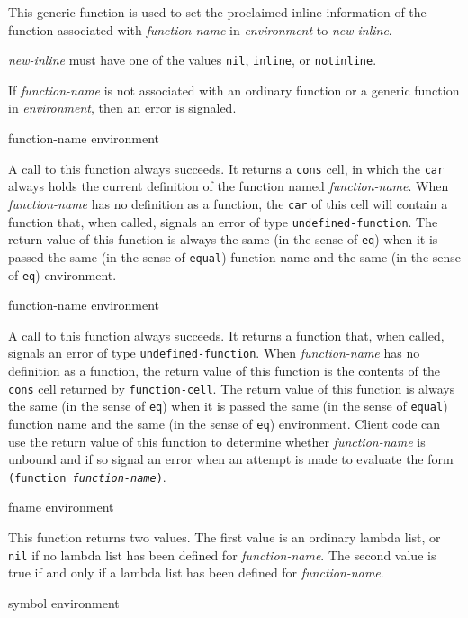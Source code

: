 This generic function is used to set the proclaimed inline information
of the function associated with \textit{function-name} in
\textit{environment} to \textit{new-inline}.

\textit{new-inline} must have one of the values \texttt{nil},
\texttt{inline}, or \texttt{notinline}.

If \textit{function-name} is not associated with an ordinary function
or a generic function in \textit{environment}, then an error is
signaled.

 {function-name environment}

A call to this function always succeeds.  It returns a \texttt{cons}
cell, in which the \texttt{car} always holds the current definition of
the function named \textit{function-name}.  When
\textit{function-name} has no definition as a function, the
\texttt{car} of this cell will contain a function that, when called,
signals an error of type \texttt{undefined-function}.  The return
value of this function is always the same (in the sense of
\texttt{eq}) when it is passed the same (in the sense of
\texttt{equal}) function name and the same (in the sense of
\texttt{eq}) environment.

 {function-name environment}

A call to this function always succeeds.  It returns a function that,
when called, signals an error of type \texttt{undefined-function}.
When \textit{function-name} has no definition as a function, the
return value of this function is the contents of the \texttt{cons}
cell returned by \texttt{function-cell}.  The return value of this
function is always the same (in the sense of \texttt{eq}) when it is
passed the same (in the sense of \texttt{equal}) function name and the
same (in the sense of \texttt{eq}) environment.  Client code can use
the return value of this function to determine whether
\textit{function-name} is unbound and if so signal an error when an
attempt is made to evaluate the form \texttt{(function
  \textrm{\textit{function-name}})}.

 {fname environment}

This function returns two values.  The first value is an ordinary
lambda list, or \texttt{nil} if no lambda list has been defined for
\textit{function-name}.  The second value is true if and only if a
lambda list has been defined for \textit{function-name}.

 {symbol environment}

